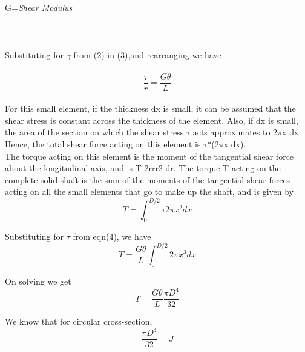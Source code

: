 \documentclass[12pt,a4paper]{article}	%
\begin{document}
G=\textit{Shear Modulus}\\
\\
\\
\\
Substituting for $\gamma$ from (2) in (3),and rearranging we have \\ \\
\begin{equation}
\frac{\tau}{r}=\frac{G\theta}{L}
\end{equation}
\\
For this small element, if the thickness dx is small, it can be assumed that the shear stress is constant across the thickness of the element. Also, if dx is small, the area of the section on which the shear stress $\tau$ acts approximates to 2$\pi$x dx. Hence, the total shear force acting on this element is $\tau$*(2$\pi$x dx).\\

The torque acting on this element is the moment of the tangential shear force about the longitudinal axis, and is T 2rrr2 dr. The torque T acting on the complete solid shaft is the sum of the moments of the tangential shear forces acting on all the small elements that go to make up the shaft, and is given by\\

\[ T= \int_{0}^{D/2}\tau2\pi x^2 dx\]

Substituting for $\tau$ from eqn(4), we have\\

\[T=\frac{G \theta}{L} \int_{0}^{D/2}2\pi x^3 dx\]

On solving we get\\
\[T=\frac{G \theta}{L}  \frac{\pi D^4}{32}\]

We know that for circular cross-section,\\
\[\frac{\pi D^4}{32}=J\]
\thispagestyle{empty}	%
\\ \\

\thispagestyle{empty}	%
\end{document}

